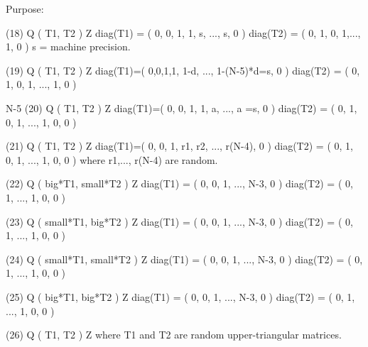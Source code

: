 \begin{DoxyParagraph}{Purpose\+: }
\begin{DoxyVerb}
 (18) Q ( T1, T2 ) Z    diag(T1) = ( 0, 0, 1, 1, s, ..., s, 0 )
                        diag(T2) = ( 0, 1, 0, 1,..., 1, 0 )
                        s = machine precision.

 (19) Q ( T1, T2 ) Z    diag(T1)=( 0,0,1,1, 1-d, ..., 1-(N-5)*d=s, 0 )
                        diag(T2) = ( 0, 1, 0, 1, ..., 1, 0 )

                                                        N-5
 (20) Q ( T1, T2 ) Z    diag(T1)=( 0, 0, 1, 1, a, ..., a   =s, 0 )
                        diag(T2) = ( 0, 1, 0, 1, ..., 1, 0, 0 )

 (21) Q ( T1, T2 ) Z    diag(T1)=( 0, 0, 1, r1, r2, ..., r(N-4), 0 )
                        diag(T2) = ( 0, 1, 0, 1, ..., 1, 0, 0 )
                        where r1,..., r(N-4) are random.

 (22) Q ( big*T1, small*T2 ) Z    diag(T1) = ( 0, 0, 1, ..., N-3, 0 )
                                  diag(T2) = ( 0, 1, ..., 1, 0, 0 )

 (23) Q ( small*T1, big*T2 ) Z    diag(T1) = ( 0, 0, 1, ..., N-3, 0 )
                                  diag(T2) = ( 0, 1, ..., 1, 0, 0 )

 (24) Q ( small*T1, small*T2 ) Z  diag(T1) = ( 0, 0, 1, ..., N-3, 0 )
                                  diag(T2) = ( 0, 1, ..., 1, 0, 0 )

 (25) Q ( big*T1, big*T2 ) Z      diag(T1) = ( 0, 0, 1, ..., N-3, 0 )
                                  diag(T2) = ( 0, 1, ..., 1, 0, 0 )

 (26) Q ( T1, T2 ) Z     where T1 and T2 are random upper-triangular
                         matrices.\end{DoxyVerb}
 
\end{DoxyParagraph}

